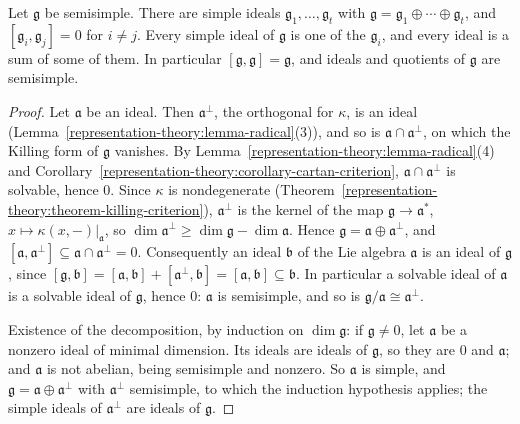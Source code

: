 \begin{theorem}\label{representation-theory:theorem-simple-ideals}
Let $\mathfrak{g}$ be semisimple. There are simple ideals $\mathfrak{g}_1, \ldots, \mathfrak{g}_t$ with $\mathfrak{g} = \mathfrak{g}_1 \oplus \cdots \oplus \mathfrak{g}_t$, and
$[\mathfrak{g}_i, \mathfrak{g}_j] = 0$ for $i \neq j$. Every simple ideal of $\mathfrak{g}$ is one of the $\mathfrak{g}_i$, and every ideal is a sum of some of them. In
particular $[\mathfrak{g}, \mathfrak{g}] = \mathfrak{g}$, and ideals and quotients of $\mathfrak{g}$ are semisimple.
\end{theorem}

\begin{proof}
Let $\mathfrak{a}$ be an ideal. Then $\mathfrak{a}^\perp$, the orthogonal for $\kappa$, is an ideal (Lemma~\ref{representation-theory:lemma-radical}(3)), and so is
$\mathfrak{a} \cap \mathfrak{a}^\perp$, on which the Killing form of $\mathfrak{g}$ vanishes. By Lemma~\ref{representation-theory:lemma-radical}(4) and
Corollary~\ref{representation-theory:corollary-cartan-criterion}, $\mathfrak{a} \cap \mathfrak{a}^\perp$ is solvable, hence $0$. Since $\kappa$ is nondegenerate
(Theorem~\ref{representation-theory:theorem-killing-criterion}), $\mathfrak{a}^\perp$ is the kernel of the map $\mathfrak{g} \to \mathfrak{a}^*$, $x \mapsto \kappa(x, -)|_{\mathfrak{a}}$,
so $\dim\mathfrak{a}^\perp \geq \dim\mathfrak{g} - \dim\mathfrak{a}$. Hence $\mathfrak{g} = \mathfrak{a} \oplus \mathfrak{a}^\perp$, and $[\mathfrak{a}, \mathfrak{a}^\perp] \subseteq
\mathfrak{a} \cap \mathfrak{a}^\perp = 0$. Consequently an ideal $\mathfrak{b}$ of the Lie algebra $\mathfrak{a}$ is an ideal of $\mathfrak{g}$, since
$[\mathfrak{g}, \mathfrak{b}] = [\mathfrak{a}, \mathfrak{b}] + [\mathfrak{a}^\perp, \mathfrak{b}] = [\mathfrak{a}, \mathfrak{b}] \subseteq \mathfrak{b}$. In particular a solvable
ideal of $\mathfrak{a}$ is a solvable ideal of $\mathfrak{g}$, hence $0$: $\mathfrak{a}$ is semisimple, and so is $\mathfrak{g}/\mathfrak{a} \cong \mathfrak{a}^\perp$.

Existence of the decomposition, by induction on $\dim\mathfrak{g}$: if $\mathfrak{g} \neq 0$, let $\mathfrak{a}$ be a nonzero ideal of minimal dimension. Its ideals are ideals of
$\mathfrak{g}$, so they are $0$ and $\mathfrak{a}$; and $\mathfrak{a}$ is not abelian, being semisimple and nonzero. So $\mathfrak{a}$ is simple, and $\mathfrak{g} = \mathfrak{a}
\oplus \mathfrak{a}^\perp$ with $\mathfrak{a}^\perp$ semisimple, to which the induction hypothesis applies; the simple ideals of $\mathfrak{a}^\perp$ are ideals of $\mathfrak{g}$.


\end{proof}

